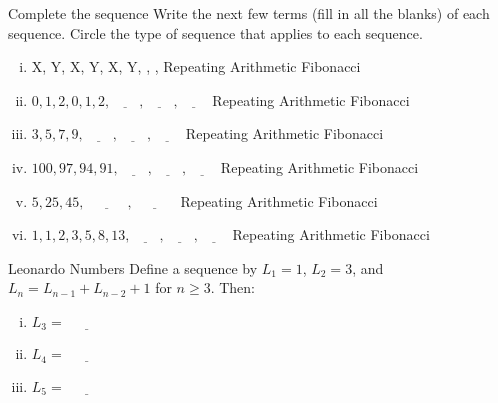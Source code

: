 \documentclass[12pt,letterpaper]{article}
\begin{document}
\begin{problem}{Complete the sequence}
 Write the next few terms (fill in all the blanks) of each sequence. Circle the
 type of sequence that applies to each sequence.

 \begin{enumerate}[i.]
  \item X, Y, X, Y, X, Y, \underline{\hspace{2em}}, \underline{\hspace{2em}},
   \underline{\hspace{2em}}
  \hfill Repeating Arithmetic Fibonacci
  \item $0, 1, 2, 0, 1, 2, \underline{\hspace{2em}}, \underline{\hspace{2em}},
  \underline{\hspace{2em}}$
  \hfill Repeating Arithmetic Fibonacci
  \item $3, 5, 7, 9, \underline{\hspace{2em}}, \underline{\hspace{2em}},
  \underline{\hspace{2em}}$
  \hfill Repeating Arithmetic Fibonacci
  \item $100, 97, 94, 91, \underline{\hspace{2em}}, \underline{\hspace{2em}},
  \underline{\hspace{2em}}$
  \hfill Repeating Arithmetic Fibonacci
  \item $5, 25, 45, \underline{\hspace{3em}}, \underline{\hspace{3em}}$
  \hfill Repeating Arithmetic Fibonacci
  \item $1, 1, 2, 3, 5, 8, 13, \underline{\hspace{2em}},
  \underline{\hspace{2em}}, \underline{\hspace{2em}}$
  \hfill Repeating Arithmetic Fibonacci
 \end{enumerate}
\end{problem}

\begin{problem}{Leonardo Numbers}
 Define a sequence by $L_1 = 1$, $L_2 = 3$, and $L_n=L_{n-1} + L_{n-2} + 1$
 for $n\ge3$. Then:

 \begin{enumerate}[i.]
  \item $L_3 = \underline{\hspace{3em}}$
  \item $L_4 = \underline{\hspace{3em}}$
  \item $L_5 = \underline{\hspace{3em}}$
 \end{enumerate}
\end{problem}
\end{document}
